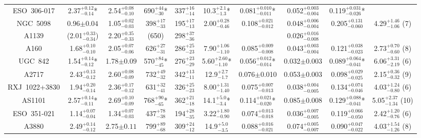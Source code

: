 \documentclass{aastex}
\begin{document}
\begin{table}
\begin{center}
{\begin{tabular}{cccccccccc}
ESO~306-017 & 2.37$^{+0.12}_{-0.14}$* & 2.54$^{+0.08}_{-0.10}$ & 690$^{+44}_{-30}$* & 337$^{+16}_{-14}$ & 10.3$^{+2.1}_{-1.3}$* & 0.081$^{+0.010}_{-0.011}$* & 0.052$^{+0.003}_{-0.004}$ & 0.119$^{+0.031}_{-0.026}$* & \\
NGC~5098 & 0.96$\pm0.04$ & 1.05$^{+0.02}_{-0.03}$ & 398$^{+17}_{-33}$ & 195$^{+17}_{-13}$ & 2.00$^{+0.28}_{-0.46}$ & 0.108$^{+0.021}_{-0.012}$ & 0.048$^{+0.006}_{-0.004}$ & 0.205$^{+0.131}_{-0.060}$ & 4.29$^{+1.46}_{-1.06}$ (7) \\
A1139 & (2.01$^{+0.33}_{-0.34}$) & 2.20$^{+0.35}_{-0.33}$ & (650) & 298$^{+37}_{-36}$ & & & 0.026$^{+0.016}_{-0.008}$ & & \\
A160  & 1.68$^{+0.10}_{-0.10}$ & 2.05$^{+0.07}_{-0.06}$ & 626$^{+27}_{-31}$ & 286$^{+25}_{-23}$ & 7.90$^{+1.06}_{-1.10}$ & 0.085$^{+0.009}_{-0.008}$ & 0.043$^{+0.003}_{-0.004}$ & 0.121$^{+0.038}_{-0.023}$ & 2.73$^{+0.70}_{-0.60}$ (8) \\
UGC~842  & 1.54$^{+0.14}_{-0.12}$* & 1.78$\pm0.09$ & 570$^{+84}_{-45}$* & 276$^{+23}_{-29}$ & 5.60$^{+2.60}_{-1.10}$* & 0.056$^{+0.012}_{-0.014}$* & 0.032$\pm$0.003 & 0.089$^{+0.064}_{-0.041}$* & 6.06$^{+3.31}_{-2.19}$ (6) \\
A2717 & 2.43$^{+0.13}_{-0.12}$ & 2.60$^{+0.08}_{-0.09}$ & 732$^{+49}_{-32}$ & 342$^{+13}_{-11}$ & 12.9$^{+2.7}_{-1.7}$ & 0.076$\pm$0.010 & 0.053$\pm$0.003 & 0.098$^{+0.029}_{-0.025}$ & 2.15$^{+0.36}_{-0.32}$ (9) \\
RXJ~1022+3830 & 1.94$^{+0.20}_{-0.14}$ & 2.36$^{+0.17}_{-0.12}$ & 631$^{+32}_{-41}$ & 326$^{+25}_{-23}$ & 8.00$^{+1.31}_{-1.40}$ & 0.075$^{+0.007}_{-0.013}$ & 0.038$^{+0.004}_{-0.005}$ & 0.134$^{+0.074}_{-0.046}$ & 4.03$^{+1.24}_{-0.80}$ (6) \\
AS1101   & 2.57$^{+0.14}_{-0.11}$* & 2.69$^{+0.10}_{-0.09}$ & 768$^{+90}_{-65}$* & 362$^{+21}_{-18}$ & 14.1$^{+5.0}_{-3.4}$* & 0.114$^{+0.021}_{-0.020}$* & 0.085$\pm$0.008 & 0.129$^{+0.088}_{-0.041}$* & 5.05$^{+2.37}_{-1.34}$ (10) \\
ESO~351-021 & 1.14$^{+0.07}_{-0.04}$ & 1.34$^{+0.07}_{-0.03}$ & 437$^{+78}_{-38}$ & 194$^{+28}_{-35}$ & 3.22$^{+1.80}_{-0.90}$ & 0.074$^{+0.013}_{-0.018}$ & 0.036$^{+0.007}_{-0.005}$ & 0.119$^{+0.066}_{-0.050}$ & 2.42$^{+1.20}_{-0.76}$ (6) \\
A3880 & 2.49$^{+0.14}_{-0.12}$ & 2.75$\pm0.11$ & 799$^{+89}_{-68}$ & 309$^{+24}_{-12}$ & 14.9$^{+5.0}_{-3.5}$ & 0.088$^{+0.016}_{-0.021}$ & 0.074$^{+0.005}_{-0.007}$ & 0.090$^{+0.047}_{-0.022}$ & 4.03$^{+1.54}_{-1.26}$ (8) \\

\end{tabular}}
\end{center}
\end{table}
\end{document}
